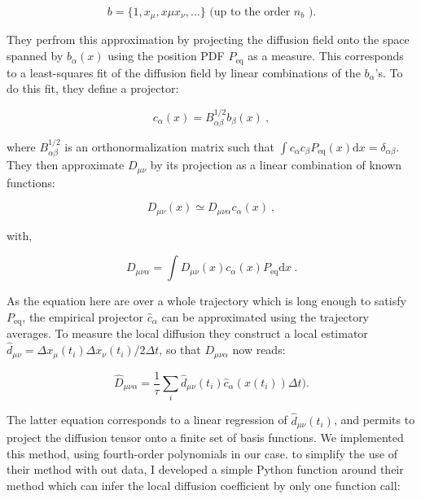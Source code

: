 \begin{equation}
	b = \{1, x_\mu, x\mu x_\nu, ...\} \text{ (up to the order } n_b \text{ )}.
\end{equation} 

They perfrom this approximation by projecting the diffusion field onto the space spanned by $b_\alpha (x)$ using the position \gls{PDF} $P_\mathrm{eq}$ as a measure. This corresponds to a least-squares fit of the diffusion field by linear combinations of the $b_\alpha$'s. To do this fit, they define a projector:

\begin{equation}
	c_\alpha (x) = B^{1/2}_{\alpha \beta} b_\beta (x) ~,
\end{equation}

where $ B^{1/2}_{\alpha \beta}$ is an orthonormalization matrix such that $\int c_\alpha c_\beta P_\mathrm{eq}(x)\mathrm{d}x = \delta _{\alpha \beta}$. They then approximate $D_{\mu \nu}$ by its projection as a linear combination of known functions:

\begin{equation}
	D_{\mu \nu} (x) \simeq D_{\mu \nu \alpha} c_\alpha (x) ~,
\end{equation}  

with,

\begin{equation}
	D_{\mu \nu \alpha} = \int D_{\mu \nu}(x) c_\alpha (x) P_\mathrm{eq} \mathrm{d}x ~.
\end{equation}

As the equation here are over a whole trajectory which is long enough to satisfy $P_\mathrm{eq}$, the empirical projector $\hat{c}_\alpha$ can be approximated using the trajectory averages. To measure the local diffusion they construct a local estimator $\hat{d}_{\mu \nu} = \Delta x_\mu (t_i) \Delta x_\nu (t_i) / 2\Delta t$, so that $D_{\mu \nu \alpha}$ now reads:

\begin{equation}
	\hat{D}_{\mu \nu \alpha} = \frac{1}{\tau} \sum _i \hat{d}_{\mu \nu} (t_i) \hat{c}_\alpha (x (t_i)) \Delta t).
\end{equation}

The latter equation corresponds to a linear regression of $\hat{d}_{\mu \nu} (t_i)$, and permits to project the diffusion tensor onto a finite set of basis functions. We implemented this method, using fourth-order polynomials in our case. to simplify the use of their method with out data, I developed a simple Python function around their method \href{https://github.com/eXpensia/StochasticForceInference/blob/master/fun_SFI.py}{\faGithub} which can infer the local diffusion coefficient by only one function call: 


